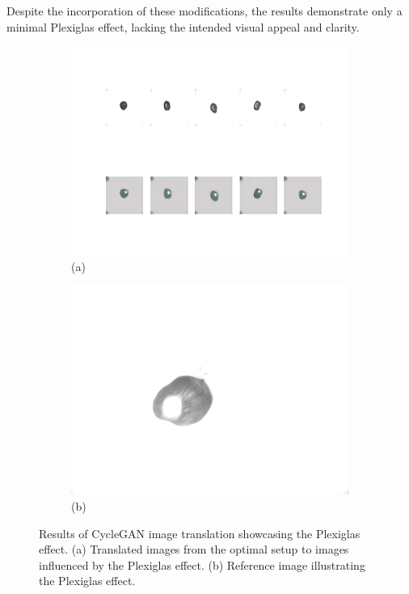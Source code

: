 \documentclass[12pt,DIV14,BCOR12mm,a4paper,footinclude=false,headinclude,parskip=half-,twoside,openright,cleardoublepage=empty,toc=index,bibliography=totoc,listof=totoc]{scrreprt}
\numberwithin{equation}{chapter}
\begin{document}
Despite the incorporation of these modifications, the results demonstrate only a minimal Plexiglas effect, lacking the intended visual appeal and clarity.
\begin{figure}
    \centering
    \begin{subfigure}[b]{0.85\textwidth}
        \centering
        \includegraphics[width=\textwidth]{../media/plexiglas.png}
        \caption*{(a)}
    \end{subfigure}
    \hfill
    \begin{subfigure}[b]{0.25\textwidth}
        \centering
        \includegraphics[width=\textwidth]{../media/plexiglas_real.png}
        \caption*{(b)}
    \end{subfigure}
    \caption{Results of CycleGAN image translation showcasing the Plexiglas effect. (a) Translated images from the optimal setup to images influenced by the Plexiglas effect. (b) Reference image illustrating the Plexiglas effect.}
    \label{fig:plexiglas_result}
\end{figure}
\end{document}
